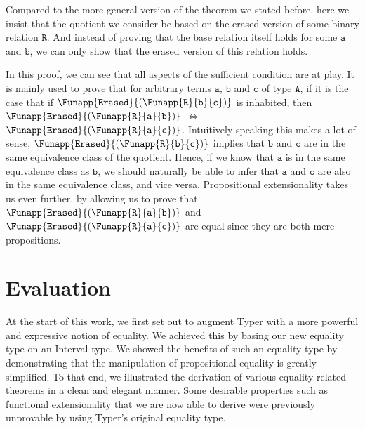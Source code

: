 \documentclass[12pt,twoside,maitrise]{dms}
\theoremstyle{definition}
\numberwithin{equation}{section}
\numberwithin{table}{chapter}
\numberwithin{figure}{chapter}
\newcommand\id[1] {\texttt{#1}}
\begin{document}
Compared to the more general version of the theorem we stated before, here we
insist that the quotient we consider be based on the erased version of some
binary relation $\id{R}$. And instead of proving that the base relation itself
holds for some $\id{a}$ and $\id{b}$, we can only show that the erased version
of this relation holds.

In this proof, we can see that all aspects of the sufficient condition are at
play. It is mainly used to prove that for arbitrary terms $\id{a}$, $\id{b}$ and
$\id{c}$ of type $\id{A}$, if it is the case that if
$\Funapp{\id{Erased}}{(\Funapp{\id{R}}{\id{b}}{\id{c}})}$ is inhabited, then
$\Funapp{\id{Erased}}{(\Funapp{\id{R}}{\id{a}}{\id{b}})}$ $\iff$
$\Funapp{\id{Erased}}{(\Funapp{\id{R}}{\id{a}}{\id{c}})}$. Intuitively speaking
this makes a lot of sense,
$\Funapp{\id{Erased}}{(\Funapp{\id{R}}{\id{b}}{\id{c}})}$ implies that $\id{b}$
and $\id{c}$ are in the same equivalence class of the quotient. Hence, if we
know that $\id{a}$ is in the same equivalence class as $\id{b}$, we should
naturally be able to infer that $\id{a}$ and $\id{c}$ are also in the same
equivalence class, and vice versa. Propositional extensionality takes us even
further, by allowing us to prove that
$\Funapp{\id{Erased}}{(\Funapp{\id{R}}{\id{a}}{\id{b}})}$ and
$\Funapp{\id{Erased}}{(\Funapp{\id{R}}{\id{a}}{\id{c}})}$ are equal since they
are both mere propositions.

\chapter{Evaluation}\label{ch:evaluation}

At the start of this work, we first set out to augment Typer with a more
powerful and expressive notion of equality. We achieved this by basing our new
equality type on an Interval type. We showed the benefits of such an equality
type by demonstrating that the manipulation of propositional equality is greatly
simplified. To that end, we illustrated the derivation of various
equality-related theorems in a clean and elegant manner. Some desirable
properties such as functional extensionality that we are now able to derive were
previously unprovable by using Typer's original equality type.
\end{document}

